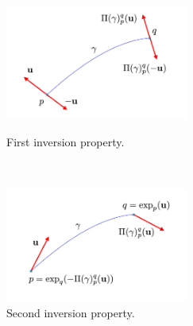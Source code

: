 \begin{figure}[htbp]
	\centering
	\begin{minipage}[b]{3cm}
		\hspace{-4cm}
		\centering
		\includegraphics[width=6cm]{figures/inversion_1.pdf}
		\caption{First inversion property.}
		\label{fig:inversion_propr1}
	\end{minipage}
	\ \hspace{9mm} \
	\begin{minipage}[b]{4cm}
		\centering
		\includegraphics[width=6cm]{figures/inversion_2.pdf}
		\caption{Second inversion property.}
		\label{fig:inversion_propr2}
	\end{minipage}
\end{figure}

%

